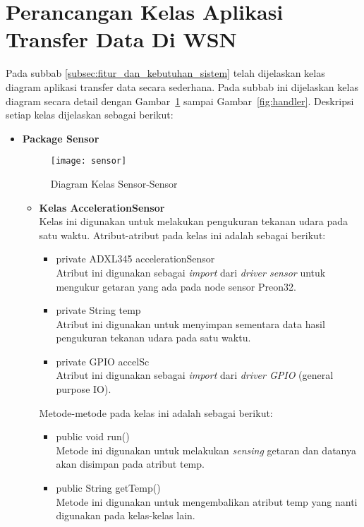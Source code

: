 \section{Perancangan Kelas Aplikasi Transfer Data Di WSN}
Pada subbab \ref{subsec:fitur_dan_kebutuhan_sistem} telah dijelaskan kelas diagram aplikasi transfer data secara sederhana. Pada subbab ini dijelaskan kelas diagram secara detail dengan Gambar~\ref{fig:sensor} sampai Gambar~\ref{fig:handler}. Deskripsi setiap kelas dijelaskan sebagai berikut:
\begin{itemize}
    \item \textbf{Package Sensor}
    \begin{figure}[h]
    	\centering
    	\texttt{[image: sensor]}
    	\caption{Diagram Kelas Sensor-Sensor}
    	\label{fig:sensor}
    \end{figure}
    \begin{itemize}
        \item \textbf{Kelas AccelerationSensor}\\
        Kelas ini digunakan untuk melakukan pengukuran tekanan udara pada satu waktu. Atribut-atribut pada kelas ini adalah sebagai berikut:
        \begin{itemize}
            \item private ADXL345 accelerationSensor\\
            Atribut ini digunakan sebagai \textit{import} dari \textit{driver sensor} untuk mengukur getaran yang ada pada node sensor Preon32.
            \item private String temp\\
            Atribut ini digunakan untuk menyimpan sementara data hasil pengukuran tekanan udara pada satu waktu.
            \item private GPIO accelSc\\
            Atribut ini digunakan sebagai \textit{import} dari \textit{driver GPIO} (general purpose IO).
        \end{itemize}
        Metode-metode pada kelas ini adalah sebagai berikut:
        \begin{itemize}
            \item public void run()\\
            Metode ini digunakan untuk melakukan \textit{sensing} getaran dan datanya akan disimpan pada atribut temp.
            \item public String getTemp()\\
            Metode ini digunakan untuk mengembalikan atribut temp yang nanti digunakan pada kelas-kelas lain.

\end{itemize}
\end{itemize}
\end{itemize}

